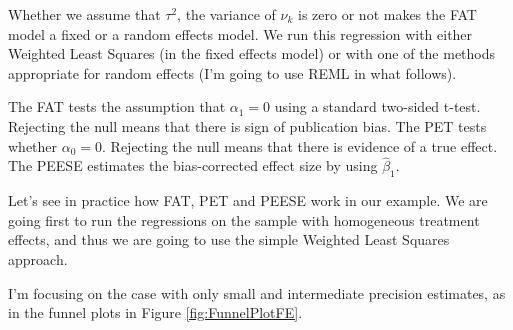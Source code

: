 \documentclass[]{book}
\theoremstyle{definition}
\theoremstyle{definition}
\theoremstyle{definition}
\theoremstyle{remark}
\let\BeginKnitrBlock\begin \let\EndKnitrBlock\end
\begin{document}
Whether we assume that \(\tau^2\), the variance of \(\nu_k\) is zero or not makes the FAT model a fixed or a random effects model.
We run this regression with either Weighted Least Squares (in the fixed effects model) or with one of the methods appropriate for random effects (I'm going to use REML in what follows).

The FAT tests the assumption that \(\alpha_1=0\) using a standard two-sided t-test.
Rejecting the null means that there is sign of publication bias.
The PET tests whether \(\alpha_0=0\).
Rejecting the null means that there is evidence of a true effect.
The PEESE estimates the bias-corrected effect size by using \(\hat{\beta}_1\).

\BeginKnitrBlock{example}
\protect\hypertarget{exm:unnamed-chunk-166}{}{\label{exm:unnamed-chunk-166} }Let's see in practice how FAT, PET and PEESE work in our example.
We are going first to run the regressions on the sample with homogeneous treatment effects, and thus we are going to use the simple Weighted Least Squares approach.
\EndKnitrBlock{example}

I'm focusing on the case with only small and intermediate precision estimates, as in the funnel plots in Figure \ref{fig:FunnelPlotFE}.
\end{document}
